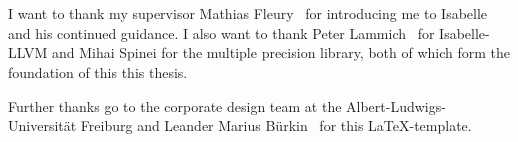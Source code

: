 \section*{}\label{sec:acknowledgements}

I want to thank my supervisor Mathias Fleury~ for introducing me to Isabelle and his continued guidance.
I also want to thank Peter Lammich~ for Isabelle-LLVM and Mihai Spinei for the multiple precision library, both of which form the foundation of this this thesis.

Further thanks go to the corporate design team
at the Albert-Ludwigs-Universität Freiburg and Leander Marius
Bürkin~ for this \LaTeX-template.

